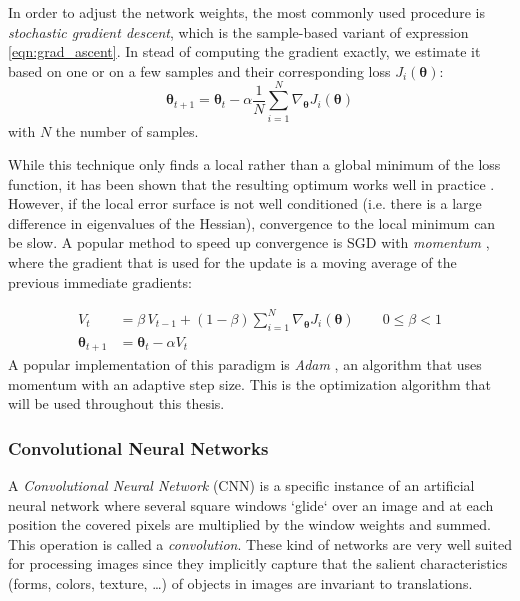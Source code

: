 In order to adjust the network weights, the most commonly used procedure is \emph{stochastic gradient descent}, which is the sample-based variant of expression \ref{eqn:grad_ascent}. In stead of computing the gradient exactly, we estimate it based on one or on a few samples and their corresponding loss $J_{i}(\bm{\theta})$: 
\begin{equation}
    \label{eqn:sgd}
    \bm{\theta}_{t+1} = \bm{\theta}_{t} - \alpha \frac{1}{N} \sum_{i=1}^{N} \nabla_{\bm{\theta}} J_{i}(\bm{\theta})
\end{equation}
with $N$ the number of samples.

While this technique only finds a local rather than a global minimum of the loss function, it has been shown that the resulting optimum works well in practice \cite{bottou2010large}.  However, if the local error surface is not well conditioned (i.e. there is a large difference in eigenvalues of the Hessian), convergence to the local minimum can be slow. A popular method to speed up convergence is SGD with \emph{momentum} \cite{qian1999momentum}, where the gradient that is used for the update is a moving average of the previous immediate gradients:

\begin{align*}
        V_t &= \beta \, V_{t-1} + (1-\beta) \sum_{i=1}^{N} \nabla_{\bm{\theta}} J_{i}(\bm{\theta}) \quad \quad 0 \leq \beta < 1\\
        \bm{\theta}_{t+1} &= \bm{\theta}_{t} - \alpha V_t
\end{align*}
A popular implementation of this paradigm is \emph{Adam} \cite{kingma2014adam}, an algorithm that uses momentum with an adaptive step size. This is the optimization algorithm that will be used throughout this thesis.

\subsubsection{Convolutional Neural Networks}
A \emph{Convolutional Neural Network} (CNN) \cite{lecun1989backpropagation} is a specific instance of an artificial neural network where several square windows `glide` over an image and at each position the covered pixels are multiplied by the window weights and summed. This operation is called a \emph{convolution}. These kind of networks are very well suited for processing images since they implicitly capture that the salient characteristics (forms, colors, texture, \ldots) of objects in images are invariant to translations.\\

